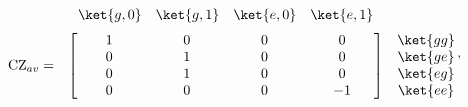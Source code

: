 \documentclass[a4paper,11pt]{article} %
\begin{document}
\begin{equation*} \label{ec_ions_CZav}
 \begin{matrix}
    & 
    \begin{matrix}
      \ket{g,0} & 
      \ket{g,1} & 
      \ket{e,0} &
      \ket{e,1}
    \end{matrix} 	&  \\[.5\normalbaselineskip]
    \text{CZ}_{av} = & 
    \begin{bmatrix}
        \makebox[\widthof{$\ket{g,0}$}]{$1$} & 
        \makebox[\widthof{$\ket{g,0}$}]{$0$} & 
        \makebox[\widthof{$\ket{g,0}$}]{$0$} & 
        \makebox[\widthof{$\ket{g,0}$}]{$0$} \\
        \makebox[\widthof{$\ket{g,0}$}]{$0$} & 
        \makebox[\widthof{$\ket{g,0}$}]{$1$} & 
        \makebox[\widthof{$\ket{g,0}$}]{$0$} & 
        \makebox[\widthof{$\ket{g,0}$}]{$0$} \\
        \makebox[\widthof{$\ket{g,0}$}]{$0$} & 
        \makebox[\widthof{$\ket{g,0}$}]{$1$} & 
        \makebox[\widthof{$\ket{g,0}$}]{$0$} & 
        \makebox[\widthof{$\ket{g,0}$}]{$0$} \\
        \makebox[\widthof{$\ket{g,0}$}]{$0$} & 
        \makebox[\widthof{$\ket{g,0}$}]{$0$} & 
        \makebox[\widthof{$\ket{g,0}$}]{$0$} & 
        \makebox[\widthof{$\ket{g,0}$}]{$-1$} \\
    \end{bmatrix} &
    \begin{matrix} \ket{gg} \\ \ket{ge} \\ \ket{eg} \\ \ket{ee} \end{matrix} 
\end{matrix} \,,
\end{equation*}
\end{document}
